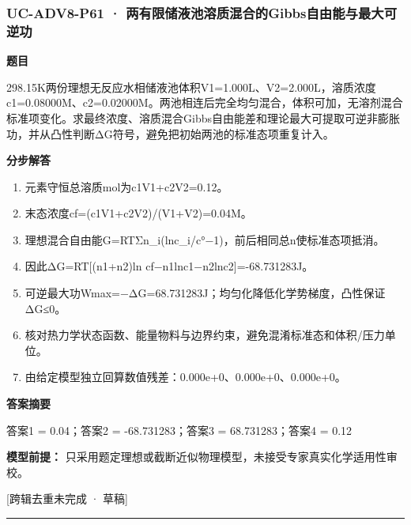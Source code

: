 \documentclass[UTF8,11pt,a4paper]{ctexart}
\begin{document}
\subsubsection*{UC-ADV8-P61 · 两有限储液池溶质混合的Gibbs自由能与最大可逆功}
\noindent\textbf{题目}\par
298.15K两份理想无反应水相储液池体积V1=1.000L、V2=2.000L，溶质浓度c1=0.08000M、c2=0.02000M。两池相连后完全均匀混合，体积可加，无溶剂混合标准项变化。求最终浓度、溶质混合Gibbs自由能差和理论最大可提取可逆非膨胀功，并从凸性判断ΔG符号，避免把初始两池的标准态项重复计入。\par
\medskip\noindent\textbf{分步解答}
\begin{enumerate}
\item 元素守恒总溶质mol为c1V1+c2V2=0.12。
\item 末态浓度cf=(c1V1+c2V2)/(V1+V2)=0.04M。
\item 理想混合自由能G=RTΣn\_i(lnc\_i/c°−1)，前后相同总n使标准态项抵消。
\item 因此ΔG=RT[(n1+n2)ln cf−n1lnc1−n2lnc2]=-68.731283J。
\item 可逆最大功Wmax=−ΔG=68.731283J；均匀化降低化学势梯度，凸性保证ΔG≤0。
\item 核对热力学状态函数、能量物料与边界约束，避免混淆标准态和体积/压力单位。
\item 由给定模型独立回算数值残差：0.000e+0、0.000e+0、0.000e+0。
\end{enumerate}
\noindent\textbf{答案摘要}\par
答案1 = 0.04；答案2 = -68.731283；答案3 = 68.731283；答案4 = 0.12\par
\noindent\textbf{模型前提：}
只采用题定理想或截断近似物理模型，未接受专家真实化学适用性审校。\par
\noindent\textcolor{red!65!black}{[跨辑去重未完成 · 草稿]} \par
\medskip\hrule\medskip
{}
\end{document}
